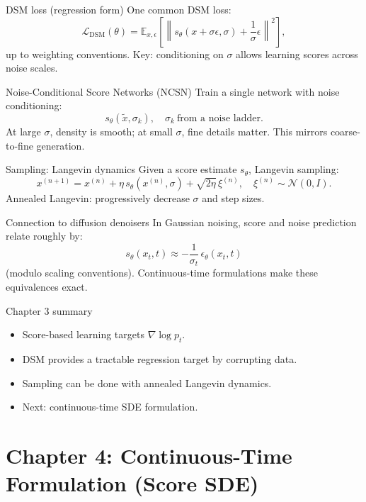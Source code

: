 \documentclass[aspectratio=169]{beamer}
\begin{document}
\begin{frame}{DSM loss (regression form)}
One common DSM loss:
\[
\mathcal{L}_{\text{DSM}}(\theta)=\mathbb{E}_{x,\epsilon}\left[\left\|s_\theta(x+\sigma\epsilon,\sigma)+\frac{1}{\sigma}\epsilon\right\|^2\right],
\]
up to weighting conventions.
Key: conditioning on \(\sigma\) allows learning scores across noise scales.
\end{frame}

\begin{frame}{Noise-Conditional Score Networks (NCSN)}
Train a single network with noise conditioning:
\[
s_\theta(\tilde x,\sigma_k),\quad \sigma_k\ \text{from a noise ladder}.
\]
At large \(\sigma\), density is smooth; at small \(\sigma\), fine details matter.
This mirrors coarse-to-fine generation.
\end{frame}

\begin{frame}{Sampling: Langevin dynamics}
Given a score estimate \(s_\theta\), Langevin sampling:
\[
x^{(n+1)} = x^{(n)} + \eta\, s_\theta(x^{(n)},\sigma) + \sqrt{2\eta}\,\xi^{(n)},\quad \xi^{(n)}\sim\mathcal{N}(0,I).
\]
Annealed Langevin: progressively decrease \(\sigma\) and step sizes.
\end{frame}

\begin{frame}{Connection to diffusion denoisers}
In Gaussian noising, score and noise prediction relate roughly by:
\[
s_\theta(x_t,t) \approx -\frac{1}{\sigma_t}\,\epsilon_\theta(x_t,t)
\]
(modulo scaling conventions).
Continuous-time formulations make these equivalences exact.
\end{frame}

\begin{frame}{Chapter 3 summary}
\begin{itemize}
\item Score-based learning targets \(\nabla\log p_t\).
\item DSM provides a tractable regression target by corrupting data.
\item Sampling can be done with annealed Langevin dynamics.
\item Next: continuous-time SDE formulation.
\end{itemize}
\end{frame}

\section{Chapter 4: Continuous-Time Formulation (Score SDE)}
\end{document}
